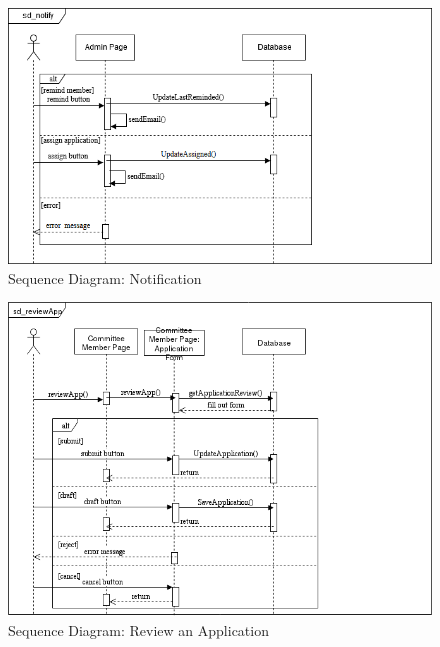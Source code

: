\documentclass[fontsize=12pt,paper=letter,twoside]{scrartcl}
\begin{document}
\begin{figure}[!htb]
\begin{center}
\includegraphics[width=.99\textwidth]{images/sd_notify.png}
\end{center}
\caption{Sequence Diagram: Notification}
\label{fig:sd_notification}
\end{figure}

\begin{figure}[!htb]
\begin{center}
\includegraphics[width=.99\textwidth]{images/sd_reviewApp.png}
\end{center}
\caption{Sequence Diagram: Review an Application}
\label{fig:sd_review_application}
\end{figure}
\end{document}
